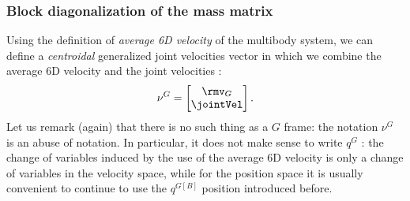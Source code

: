 \subsubsection{Block diagonalization of the mass matrix}
Using the definition of \emph{average 6D velocity} of the multibody system, we can define a \emph{centroidal} generalized joint velocities vector in which we combine the average 6D velocity and the joint velocities :
\begin{equation}
\nu^G 
= 
\begin{bmatrix}
 \rmv_G \\
 \jointVel 
\end{bmatrix}.
\end{equation}
Let us remark (again) that there is no such thing as a $G$ frame: the notation $\nu^G$ is an abuse of notation. In particular, it does not make sense to write $q^G$ : the change of variables induced by the use of the average 6D velocity is only a change of variables in the velocity space, while for the position space it is usually convenient to continue to use the $q^{G[B]}$ position introduced before.

